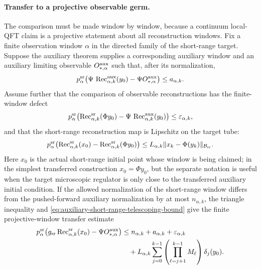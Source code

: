 \paragraph{Transfer to a projective observable germ.}
The comparison must be made window by window, because a continuum local-QFT
claim is a projective statement about all reconstruction windows.  Fix a
finite observation window \(\alpha\) in the directed family of the short-range
target.  Suppose the auxiliary theorem supplies a corresponding auxiliary
window and an auxiliary limiting observable \(O^{\rm aux}_{\ast,\alpha}\) such
that, after its normalization,
\begin{equation}
  p_\alpha^{\rm sr}\!\left(
    \Psi\,\operatorname{Rec}^{\rm aux}_{\alpha,k}(y_0)
    -
    \Psi O^{\rm aux}_{\ast,\alpha}
  \right)
  \leq
  a_{\alpha,k}.
  \label{eq:auxiliary-window-convergence-error}
\end{equation}
Assume further that the comparison of observable reconstructions has the
finite-window defect
\begin{equation}
  p_\alpha^{\rm sr}\!\left(
    \operatorname{Rec}^{\rm sr}_{\alpha,k}(\Phi y_0)
    -
    \Psi\,\operatorname{Rec}^{\rm aux}_{\alpha,k}(y_0)
  \right)
  \leq
  \varepsilon_{\alpha,k},
  \label{eq:auxiliary-target-observable-window-defect}
\end{equation}
and that the short-range reconstruction map is Lipschitz on the target tube:
\begin{equation}
  p_\alpha^{\rm sr}\!\left(
    \operatorname{Rec}^{\rm sr}_{\alpha,k}(x_0)
    -
    \operatorname{Rec}^{\rm sr}_{\alpha,k}(\Phi y_0)
  \right)
  \leq
  L_{\alpha,k}\|x_k-\Phi(y_k)\|_{\mathcal B_{\rm sr}} .
  \label{eq:short-range-window-lipschitz-orbit-error}
\end{equation}
Here \(x_0\) is the actual short-range initial point whose window is being
claimed; in the simplest transferred construction \(x_0=\Phi y_0\), but the
separate notation is useful when the target microscopic regulator is only
close to the transferred auxiliary initial condition.  If the allowed
normalization of the short-range window differs from the pushed-forward
auxiliary normalization by at most \(n_{\alpha,k}\), the triangle inequality
and \eqref{eq:auxiliary-short-range-telescoping-bound} give the finite
projective-window transfer estimate
\begin{equation}
\begin{aligned}
  p_\alpha^{\rm sr}\!\left(
    g_{\rm sr}\operatorname{Rec}^{\rm sr}_{\alpha,k}(x_0)
    -
    \Psi O^{\rm aux}_{\ast,\alpha}
  \right)
  &\leq
  n_{\alpha,k}
  +a_{\alpha,k}
  +\varepsilon_{\alpha,k}                                      \\
  &\quad+
  L_{\alpha,k}
  \sum_{j=0}^{k-1}
  \left(\prod_{\ell=j+1}^{k-1}M_\ell\right)\delta_j(y_0).
\end{aligned}
  \label{eq:auxiliary-target-projective-window-estimate}
\end{equation}
